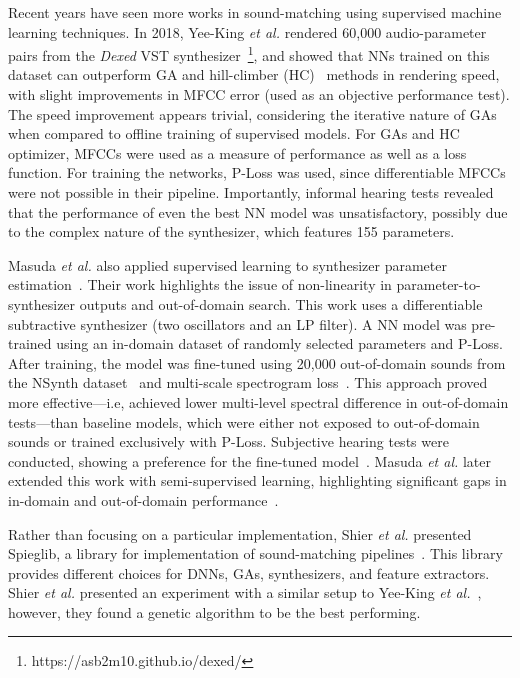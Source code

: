 \documentclass[lettersize,journal]{IEEEtran}
\providecommand{\gls}[1]{#1}
\begin{document}
Recent years have seen more works in sound-matching using supervised machine learning techniques. In 2018, Yee-King \textit{et al.} rendered 60,000 audio-parameter pairs from the \textit{Dexed} \gls{VST} synthesizer~\footnote{https://asb2m10.github.io/dexed/}, and showed that NNs trained on this dataset can outperform GA and hill-climber (\gls{HC})~\cite{hoffmann2000heuristic} methods in rendering speed, with slight improvements in MFCC error (used as an objective performance test). The speed improvement appears trivial, considering the iterative nature of GAs when compared to offline training of supervised models. For GAs and HC optimizer, MFCCs were used as a measure of performance as well as a loss function. For training the networks, P-Loss was used, since differentiable MFCCs were not possible in their pipeline. Importantly, informal hearing tests revealed that the performance of even the best NN model was unsatisfactory, possibly due to the complex nature of the synthesizer, which features 155 parameters.

Masuda \textit{et al.} also applied supervised learning to synthesizer parameter estimation~\cite{masuda2021soundmatch}. Their work highlights the issue of non-linearity in parameter-to-synthesizer outputs and out-of-domain search. This work uses a differentiable subtractive synthesizer (two oscillators and an LP filter). A NN model was pre-trained using an in-domain dataset of randomly selected parameters and P-Loss. After training, the model was fine-tuned using 20,000 out-of-domain sounds from the NSynth dataset~\cite{engel2017neural} and multi-scale spectrogram loss~\cite{engel2020ddsp}. This approach proved more effective---i.e, achieved lower multi-level spectral difference in out-of-domain tests---than baseline models, which were either not exposed to out-of-domain sounds or trained exclusively with P-Loss. Subjective hearing tests were conducted, showing a preference for the fine-tuned model~\cite{masuda2021soundmatch}. Masuda \textit{et al.} later extended this work with semi-supervised learning, highlighting significant gaps in in-domain and out-of-domain performance~\cite{masuda2023improving}.

Rather than focusing on a particular implementation, Shier \textit{et al.} presented Spieglib, a library for implementation of sound-matching pipelines~\cite{shier2020spiegelib}. This library provides different choices for DNNs, GAs, synthesizers, and feature extractors. Shier \textit{et al.} presented an experiment with a similar setup to Yee-King \textit{et al.}~\cite{yee2018automatic}, however, they found a genetic algorithm to be the best performing.
\end{document}
